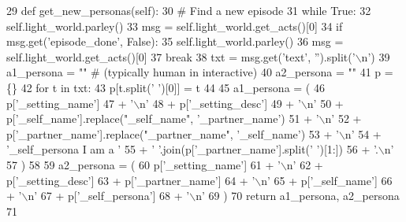 \begin{DoxyCode}
29     \textcolor{keyword}{def }get\_new\_personas(self):
30         \textcolor{comment}{# Find a new episode}
31         \textcolor{keywordflow}{while} \textcolor{keyword}{True}:
32             self.light\_world.parley()
33             msg = self.light\_world.get\_acts()[0]
34             \textcolor{keywordflow}{if} msg.get(\textcolor{stringliteral}{'episode\_done'}, \textcolor{keyword}{False}):
35                 self.light\_world.parley()
36                 msg = self.light\_world.get\_acts()[0]
37                 \textcolor{keywordflow}{break}
38         txt = msg.get(\textcolor{stringliteral}{'text'}, \textcolor{stringliteral}{''}).split(\textcolor{stringliteral}{'\(\backslash\)n'})
39         a1\_persona = \textcolor{stringliteral}{""}  \textcolor{comment}{# (typically human in interactive)}
40         a2\_persona = \textcolor{stringliteral}{""}
41         p = \{\}
42         \textcolor{keywordflow}{for} t \textcolor{keywordflow}{in} txt:
43             p[t.split(\textcolor{stringliteral}{' '})[0]] = t
44 
45         a1\_persona = (
46             p[\textcolor{stringliteral}{'\_setting\_name'}]
47             + \textcolor{stringliteral}{'\(\backslash\)n'}
48             + p[\textcolor{stringliteral}{'\_setting\_desc'}]
49             + \textcolor{stringliteral}{'\(\backslash\)n'}
50             + p[\textcolor{stringliteral}{'\_self\_name'}].replace(\textcolor{stringliteral}{"\_self\_name"}, \textcolor{stringliteral}{'\_partner\_name'})
51             + \textcolor{stringliteral}{'\(\backslash\)n'}
52             + p[\textcolor{stringliteral}{'\_partner\_name'}].replace(\textcolor{stringliteral}{"\_partner\_name"}, \textcolor{stringliteral}{'\_self\_name'})
53             + \textcolor{stringliteral}{'\(\backslash\)n'}
54             + \textcolor{stringliteral}{'\_self\_persona I am a '}
55             + \textcolor{stringliteral}{' '}.join(p[\textcolor{stringliteral}{'\_partner\_name'}].split(\textcolor{stringliteral}{' '})[1:])
56             + \textcolor{stringliteral}{'.\(\backslash\)n'}
57         )
58 
59         a2\_persona = (
60             p[\textcolor{stringliteral}{'\_setting\_name'}]
61             + \textcolor{stringliteral}{'\(\backslash\)n'}
62             + p[\textcolor{stringliteral}{'\_setting\_desc'}]
63             + p[\textcolor{stringliteral}{'\_partner\_name'}]
64             + \textcolor{stringliteral}{'\(\backslash\)n'}
65             + p[\textcolor{stringliteral}{'\_self\_name'}]
66             + \textcolor{stringliteral}{'\(\backslash\)n'}
67             + p[\textcolor{stringliteral}{'\_self\_persona'}]
68             + \textcolor{stringliteral}{'\(\backslash\)n'}
69         )
70         \textcolor{keywordflow}{return} a1\_persona, a2\_persona
71 
\end{DoxyCode}
